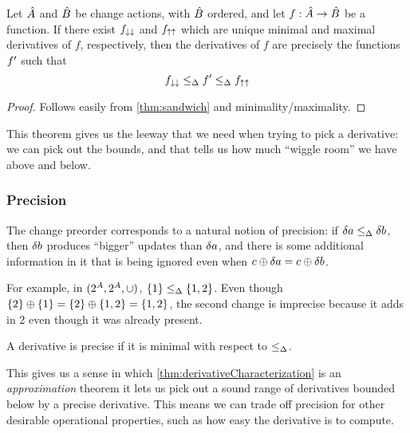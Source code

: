 \begin{thm}
\label{thm:derivativeCharacterization}
  Let $\hat{A}$ and $\hat{B}$ be change actions, with $\hat{B}$ ordered, and let
  $f: \hat{A} \rightarrow \hat{B}$ be a function. If there exist $f_{\downarrow\downarrow}$ and
  $f_{\uparrow\uparrow}$ which are unique minimal and maximal derivatives of $f$,
  respectively, then the derivatives of $f$ are precisely
  the functions $f'$ such that
  \begin{displaymath}
    f_{\downarrow\downarrow} \leq_\Delta f' \leq_\Delta f_{\uparrow\uparrow}
  \end{displaymath}
\end{thm}
\ifproofs
\begin{proof}
  Follows easily from \cref{thm:sandwich} and minimality/maximality.
\end{proof}
\fi

This theorem gives us the leeway that we need when trying to pick a derivative: we can pick out the
bounds, and that tells us how much ``wiggle room'' we have above and below.

\subsubsection{Precision}

The change preorder corresponds to a natural notion of precision: if $\delta a
\leq_\Delta \delta b$, then $\delta b$ produces ``bigger'' updates than
$\delta a$, and there is some additional information in it that is being
ignored even when $c \oplus \delta a = c \oplus \delta b$.

For example, in $(2^A,2^A,\cup)$, $\{1\} \leq_\Delta \{1,2\}$. Even
though $\{2\} \oplus \{1\} = \{2\} \oplus \{1,2\} = \{1,2\}$, the second change is
imprecise because it adds in 2 even though it was already present.

\begin{defn}
  \label{def:precision}
  A derivative is precise if it is minimal with respect to $\leq_\Delta$.
\end{defn}

This gives us a sense in which \cref{thm:derivativeCharacterization} is an
\emph{approximation} theorem \textemdash{} it lets us pick out a sound range of
derivatives bounded below by a precise derivative. This means we can trade off
precision for other desirable operational properties, such as how easy the
derivative is to compute.

